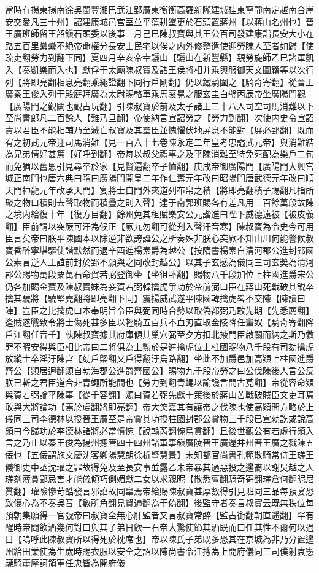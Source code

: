 當時有揚東揚南徐吳閩豐湘巴武江郢廣東衡衡高羅新隴建城桂東寧靜南定越南合崖安交愛凡三十州】詔建康城邑宫室並平蕩耕墾更於石頭置蔣州【以蔣山名州也】晉王廣班師留王韶鎭石頭委以後事三月己巳陳叔寶與其王公百司發建康詣長安大小在路五百里纍纍不絶帝命權分長安士民宅以俟之内外修整遣使迎勞陳人至者如歸【使疏吏翻勞力到翻下同】夏四月辛亥帝幸驪山【驪山在新豐縣】親勞旋師乙巳諸軍凱入【奏凱樂而入也】獻俘于太廟陳叔寶及諸王侯將相并乘輿服御天文圖籍等以次行列【將即亮翻相息亮翻乘繩證翻下同行戶剛翻】仍以鐵騎圍之【騎奇寄翻】從晉王廣秦王俊入列于殿庭拜廣為太尉賜輅車乘馬衮冕之服玄圭白璧丙辰帝坐廣陽門觀【廣陽門之觀闕也觀古玩翻】引陳叔寶於前及太子諸王二十八人司空司馬消難以下至尚書郎凡二百餘人【難乃旦翻】帝使納言宣詔勞之【勞力到翻】次使内史令宣詔責以君臣不能相輔乃至滅亡叔寶及其羣臣並愧懼伏地屏息不能對【屏必郢翻】既而宥之初武元帝迎司馬消難【見一百六十七卷陳永定二年皇考忠謚武元帝】與消難結為兄弟情好甚篤【好呼到翻】帝每以叔父禮事之及平陳消難至特免死配為樂戶二旬而免猶以舊恩引見尋卒於家【見賢遍翻卒子恤翻】庚戌帝御廣陽門【廣陽門大興宫城正南門也唐六典曰隋曰廣陽門開皇二年作仁夀元年改曰昭陽門唐武德元年改曰順天門神龍元年改承天門】宴將士自門外夾道列布帛之積【將即亮翻積子賜翻凡指所聚之物曰積則去聲取物而積疊之則入聲】達于南郭班賜各有差凡用三百餘萬段故陳之境内給復十年【復方目翻】餘州免其租賦樂安公元諧進曰陛下威德遠被【被皮義翻】臣前請以突厥可汗為候正【厥九勿翻可從刋入聲汗音寒】陳叔寶為令史今可用臣言矣帝曰朕平陳國本以除逆非欲誇誕公之所奏殊非朕心突厥不知山川何能警候叔寶昏醉寧堪驅使諧默然而退辛酉進楊素爵為越公【按隋書楊素自清河郡公進封郢國公素言逆人王誼前封於郢不願與之同改封越公】以其子玄感為儀同三司玄奬為清河郡公賜物萬段粟萬石命賀若弼登御坐【坐徂卧翻】賜物八千段加位上柱國進爵宋公仍各加賜金寶及陳叔寶妹為妾賀若弼韓擒虎爭功於帝前弼曰臣在蔣山死戰破其鋭卒擒其驍將【驍堅堯翻將即亮翻下同】震揚威武遂平陳國韓擒虎畧不交陳【陳讀曰陣】豈臣之比擒虎曰本奉明旨令臣與弼同時合勢以取偽都弼乃敢先期【先悉薦翻】逢賊遂戰致令將士傷死甚多臣以輕騎五百兵不血刃直取金陵降任蠻奴【騎奇寄翻降戶江翻任音壬】執陳叔寶據其府庫傾其巢穴弼至夕方扣北掖門臣啟關而納之斯乃救罪不暇安得與臣相比帝曰二將俱為上勲於是進擒虎位上柱國賜物八千段有司劾擒虎放縱士卒淫汙陳宫【劾戶槩翻又戶得翻汙烏路翻】坐此不加爵邑加高熲上柱國進爵齊公【熲居迥翻熲自勃海郡公進爵齊國公】賜物九千段帝勞之曰公伐陳後人言公反朕已斬之君臣道合非青蠅所能間也【勞力到翻青蠅以諭讒言間古莧翻】帝從容命熲與賀若弼論平陳事【從千容翻】熲曰賀若弼先獻十策後於蔣山苦戰破賊臣文吏耳焉敢與大將論功【焉於䖍翻將即亮翻】帝大笑嘉其有讓帝之伐陳也使高熲問方略於上儀同三司李德林以授晉王廣至是帝賞其功授柱國封郡公賞物三千段已宣勑訖或說高熲曰今歸功於李德林諸將必當憤惋【說輸芮翻惋烏貫翻】且後世觀公有若虚行熲入言之乃止以秦王俊為揚州摠管四十四州諸軍事鎭廣陵晉王廣還并州晉王廣之戮陳五佞也【五佞謂施文慶沈客卿陽慧朗徐析暨慧景】未知都官尚書孔範散騎常侍王瑳王儀御史中丞沈瓘之罪故得免及至長安事並露乙未帝暴其過惡投之邊裔以謝吳越之人瑳刻薄貪鄙忌害才能儀傾巧側媚獻二女以求親昵【散悉亶翻騎奇寄翻瑳倉何翻昵尼質翻】瓘險慘苛酷發言邪諂故同辠焉帝給賜陳叔寶甚厚數得引見班同三品每預宴恐致傷心為不奏吳音【數所角翻見賢遍翻為于偽翻】後監守者奏言叔寶云既無秩位每預朝集願得一官號帝曰叔寶全無心肝監者又言叔寶常醉【監古銜翻朝直遥翻】罕有醒時帝問飲酒幾何對曰與其子弟日飲一石帝大驚使節其酒既而曰任其性不爾何以過日【嗚呼此陳叔寶所以得死於枕席也】帝以陳氏子弟既多恐其在京城為非乃分置邊州給田業使為生歲時賜衣服以安全之詔以陳尚書令江摠為上開府儀同三司僕射袁憲驃騎蕭摩訶領軍任忠皆為開府儀